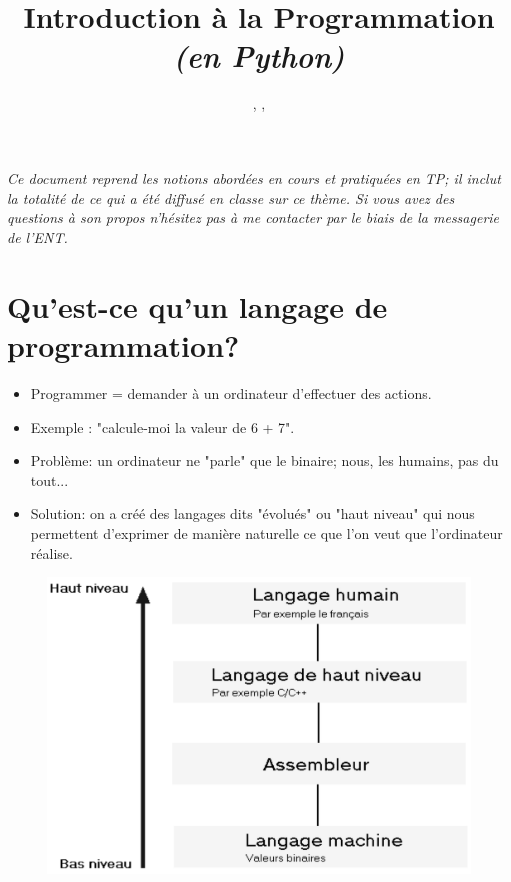 \documentclass[12pt]{article}
\title
	{
		\leavevmode
		\\ 
		\vspace{3cm}
		{\Large
		\textit
			{
				\classe\hspace{0.1cm}
				\textemdash\
				\hspace{0.1cm}
				\themecours
			}
		\\ 
		\vspace{1cm}
		\huge{Introduction à la Programmation} \\ \textit{(en Python)}}
		\\ 
		\vspace{1cm}
	}
\author{\etablissement}
\date{
	\auteur,
	\datedoc,
	\footnotesize{\textit{\versiondoc}}
	\leavevmode
	\\ 
	\vspace{6cm}
	}
\newcommand{\resumecours}{\textit{Ce document reprend les notions abordées en cours et pratiquées en TP;
		il inclut la totalité de ce qui a été diffusé en classe sur ce thème. Si vous avez des questions à son propos
		n'hésitez pas à me contacter par le biais de la messagerie de l'ENT.
}}
\begin{document}
	
	\maketitle
	\thispagestyle{empty}
		
	\section*{}
		{\noindent
		\resumecours
		}
		
	\pagebreak
	
	\tableofcontents
	
	\pagebreak
	
	\section{Qu'est-ce qu'un langage de programmation?}
	
	\begin{itemize}
		\item Programmer = demander à un ordinateur d'effectuer des actions.
		\item Exemple : "calcule-moi la valeur de 6 + 7".
		\item Problème: un ordinateur ne "parle" que le binaire; nous, les humains, pas du tout...
		\item Solution: on a créé des langages dits "évolués" ou "haut niveau" qui nous permettent d'exprimer de manière naturelle ce que l'on veut que l'ordinateur réalise.
	\end{itemize}
	
	\begin{figure}[H]
		\centering
		\includegraphics[scale=0.2]{001_LangProg.png}
	\end{figure}
	
\end{document}
